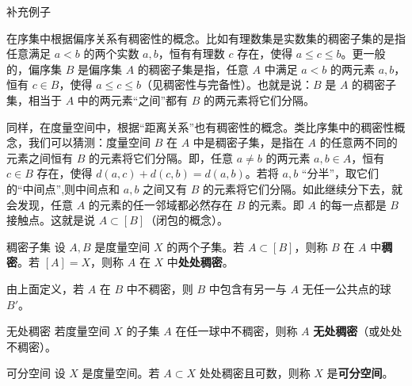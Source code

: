 
\begin{issues}
补充例子
\end{issues}

\cite{Ke1}在序集中根据偏序关系有稠密性的概念。比如有理数集是实数集的稠密子集的是指任意满足 $a<b$ 的两个实数 $a,b$，恒有有理数 $c$ 存在，使得 $a\leq c\leq b$。更一般的，偏序集 $B$ 是偏序集 $A$ 的稠密子集是指，任意 $A$ 中满足 $a<b$ 的两元素 $a,b$，恒有 $c\in B$，使得 $a\leq c\leq b$（见稠密性与完备性）。也就是说：$B$ 是 $A$ 的稠密子集，相当于 $A$ 中的两元素“之间”都有 $B$ 的两元素将它们分隔。

同样，在度量空间中，根据“距离关系”也有稠密性的概念。类比序集中的稠密性概念，我们可以猜测：度量空间 $B$ 在 $A$ 中是稠密子集，是指在 $A$ 的任意两不同的元素之间恒有 $B$ 的元素将它们分隔。即，任意 $a\neq b$ 的两元素 $a,b\in A$，恒有 $c\in B$ 存在，使得 $d(a,c)+d(c,b)=d(a,b)$。若将 $a,b$ “分半”，取它们的“中间点”,则中间点和 $a,b$ 之间又有 $B$ 的元素将它们分隔。如此继续分下去，就会发现，任意 $A$ 的元素的任一邻域都必然存在 $B$ 的元素。即 $A$ 的每一点都是 $B$ 接触点。这就是说 $A\subset [B]$（闭包的概念）。

\begin{definition}{稠密子集}\label{def_MaDen_2}
设 $A,B$ 是度量空间 $X$ 的两个子集。若 $A\subset [B]$，则称 $B$ 在 $A$ 中\textbf{稠密}。若 $[A]=X$，则称 $A$ 在 $X$ 中\textbf{处处稠密}。
\end{definition}

由上面定义，若 $A$ 在 $B$ 中不稠密，则 $B$ 中包含有另一与 $A$ 无任一公共点的球 $B'$。
\begin{definition}{无处稠密}\label{def_MaDen_1}
若度量空间 $X$ 的子集 $A$ 在任一球中不稠密，则称 $A$ \textbf{无处稠密}（或处处不稠密）。
\end{definition}

\begin{definition}{可分空间}
设 $X$ 是度量空间。若 $A\subset X$ 处处稠密且可数，则称 $X$ 是\textbf{可分空间}。
\end{definition}


